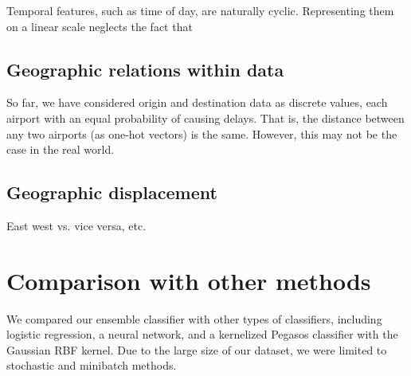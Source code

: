 \documentclass{article}
\begin{document}
\begin{multicols}{2}
Temporal features, such as time of day,
are naturally cyclic.
Representing them on a linear scale
neglects the fact that

\subsection{Geographic relations within data}

So far, we have considered origin and destination data
as discrete values,
each airport with an equal probability of causing delays.
That is, the distance between any two airports
(as one-hot vectors) is the same.
However, this may not be the case in the real world.

\subsection{Geographic displacement}

East west vs. vice versa, etc.

\section{Comparison with other methods}

We compared our ensemble classifier
with other types of classifiers,
including logistic regression, a neural network,
and a kernelized Pegasos classifier
with the Gaussian RBF kernel.
Due to the large size of our dataset,
we were limited to
stochastic and minibatch methods.

\end{multicols}
\end{document}
